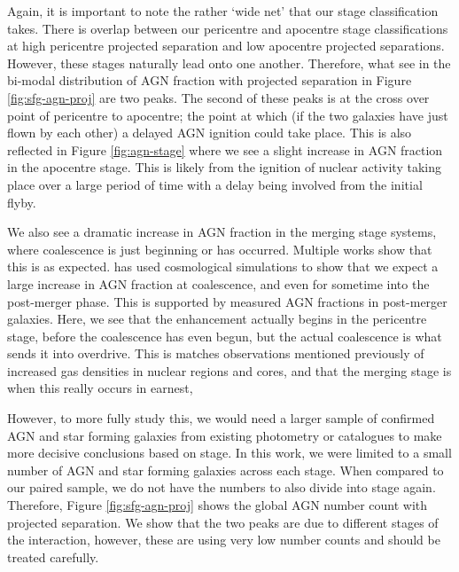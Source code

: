 Again, it is important to note the rather `wide net' that our stage classification takes. There is overlap between our pericentre and apocentre stage classifications at high pericentre projected separation and low apocentre projected separations. However, these stages naturally lead onto one another. Therefore, what see in the bi-modal distribution of AGN fraction with projected separation in Figure \ref{fig:sfg-agn-proj} are two peaks. The second of these peaks is at the cross over point of pericentre to apocentre; the point at which (if the two galaxies have just flown by each other) a delayed AGN ignition could take place. This is also reflected in Figure \ref{fig:agn-stage} where we see a slight increase in AGN fraction in the apocentre stage. This is likely from the ignition of nuclear activity taking place over a large period of time with a delay being involved from the initial flyby.

We also see a dramatic increase in AGN fraction in the merging stage systems, where coalescence is just beginning or has occurred. Multiple works show that this is as expected. \citet{2023MNRAS.519.4966B} has used cosmological simulations to show that we expect a large increase in AGN fraction at coalescence, and even for sometime into the post-merger phase. This is supported by measured AGN fractions in post-merger galaxies. Here, we see that the enhancement actually begins in the pericentre stage, before the coalescence has even begun, but the actual coalescence is what sends it into overdrive. This is matches observations mentioned previously of increased gas densities in nuclear regions and cores, and that the merging stage is when this really occurs in earnest,

However, to more fully study this, we would need a larger sample of confirmed AGN and star forming galaxies from existing photometry or catalogues to make more decisive conclusions based on stage. In this work, we were limited to a small number of AGN and star forming galaxies across each stage. When compared to our paired sample, we do not have the numbers to also divide into stage again. Therefore, Figure \ref{fig:sfg-agn-proj} shows the global AGN number count with projected separation. We show that the two peaks are due to different stages of the interaction, however, these are using very low number counts and should be treated carefully.
 
